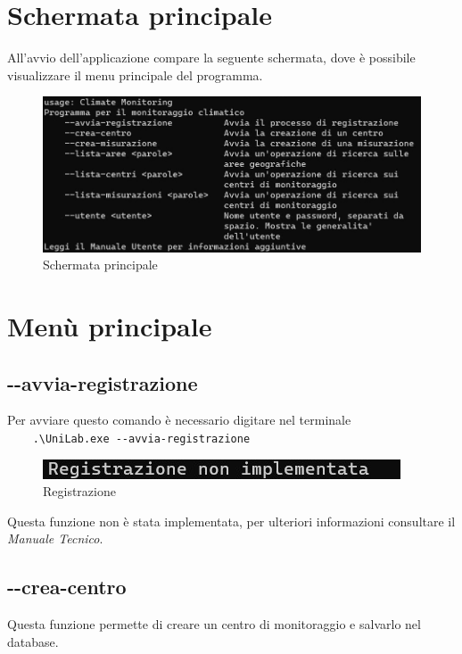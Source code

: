 \documentclass[12pt]{scrreprt}
\begin{document}
	\section{Schermata principale}


	All'avvio dell'applicazione compare la seguente schermata, dove \`e possibile visualizzare il menu principale del programma.
	\begin{figure}[H]
		\centering
		\includegraphics[width=0.9\linewidth]{Screen/schermataprincipale}
		\caption{Schermata principale}
		\label{fig:schermataprincipale}
	\end{figure}

	\section{Menù principale}

		\subsection{-$ $-avvia-registrazione}

		Per avviare questo comando \`e necessario digitare nel terminale\\
		\verb!    .\UniLab.exe --avvia-registrazione!\\
		\begin{figure}[H]
			\centering
			\includegraphics[width=0.5\linewidth]{Screen/registrazione}
			\caption{Registrazione}
			\label{fig:registrazione (non implementata)}
		\end{figure}
			Questa funzione non \`e stata implementata, per ulteriori informazioni consultare il \textsl{Manuale Tecnico}.

		\subsection{-$ $-crea-centro}
		Questa funzione permette di creare un centro di monitoraggio e salvarlo nel database.
\end{document}

